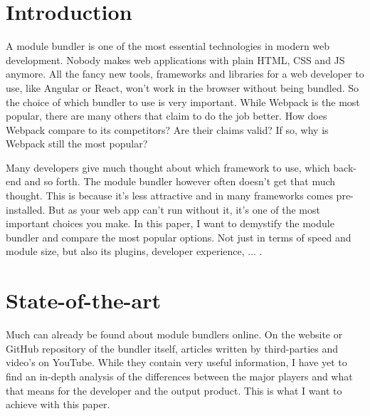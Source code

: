
\section{Introduction} %
\label{sec:introductie}

A module bundler is one of the most essential technologies in modern web development. Nobody makes web applications with plain HTML, CSS and JS anymore. All the fancy new tools, frameworks and libraries for a web developer to use, like Angular or React, won't work in the browser without being bundled. So the choice of which bundler to use is very important.
While Webpack is the most popular, there are many others that claim to do the job better. How does Webpack compare to its competitors? Are their claims valid? If so, why is Webpack still the most popular? 

Many developers give much thought about which framework to use, which back-end and so forth. The module bundler however often doesn't get that much thought. This is because it's less attractive and in many frameworks comes pre-installed. But as your web app can't run without it, it's one of the most important choices you make. In this paper, I want to demystify the module bundler and compare the most popular options. Not just in terms of speed and module size, but also its plugins, developer experience, ... .



\section{State-of-the-art}
\label{sec:state-of-the-art}

Much can already be found about module bundlers online. On the website or GitHub repository of the bundler itself, articles written by third-parties and video's on YouTube. While they contain very useful information, I have yet to find an in-depth analysis of the differences between the major players and what that means for the developer and the output product. This is what I want to achieve with this paper. 


